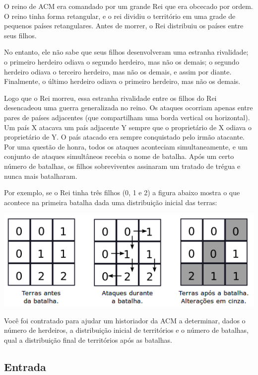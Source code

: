 O reino de ACM era comandado por um grande Rei que era obcecado por ordem. O
reino tinha forma retangular, e o rei dividiu o território em uma grade de
pequenos países retangulares. Antes de morrer, o Rei distribuiu os países entre
seus filhos.

No entanto, ele não sabe que seus filhos desenvolveram uma estranha rivalidade;
o primeiro herdeiro odiava o segundo herdeiro, mas não os demais; o segundo
herdeiro odiava o terceiro herdeiro, mas não os demais, e assim por diante.
Finalmente, o último herdeiro odiava o primeiro herdeiro, mas não os demais.

Logo que o Rei morreu, essa estranha rivalidade entre os filhos do Rei
desencadeou uma guerra generalizada no reino. Os ataques ocorriam apenas entre
pares de países adjacentes (que compartilham uma borda vertical ou horizontal).
Um país X atacava um país adjacente Y sempre que o proprietário de X odiava o
proprietário de Y. O país atacado era sempre conquistado pelo irmão atacante.
Por uma questão de honra, todos os ataques aconteciam simultaneamente, e um
conjunto de ataques simultâneos recebia o nome de batalha. Após um certo número
de batalhas, os filhos sobreviventes assinaram um tratado de trégua e nunca mais
batalharam.

Por exemplo, se o Rei tinha três filhos (0, 1 e 2) a figura abaixo mostra o que
acontece na primeira batalha dada uma distribuição inicial das terras:

\begin{center}
\includegraphics[scale=0.6]{problems/irmaos/imagens/irmaos.png}
\end{center}

Você foi contratado para ajudar um historiador da ACM a determinar, dados o
número de herdeiros, a distribuição inicial de territórios e o número de
batalhas, qual a distribuição final de territórios após as batalhas.

\subsection*{Entrada}

